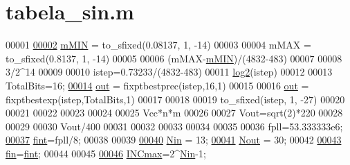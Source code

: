 \hypertarget{tabela__sin_8m_source}{}\section{tabela\+\_\+sin.\+m}

\begin{DoxyCode}
00001                                                                                        
\hypertarget{tabela__sin_8m_source_l00002}{}\hyperlink{tabela__sin_8m_a150e6d543afcb739888f1805186eaf34}{00002} \hyperlink{tabela__sin_8m_a150e6d543afcb739888f1805186eaf34}{mMIN} = to\_sfixed(0.08137,  1, -14)
00003 
00004 mMAX = to\_sfixed(0.8137,  1, -14)
00005 
00006 (mMAX-\hyperlink{tabela__sin_8m_a150e6d543afcb739888f1805186eaf34}{mMIN})/(4832-483)
00007 
00008 3/2^14
00009 
00010 istep=0.73233/(4832-483)
00011 \hyperlink{tabela__sin_8m_a96930559dafc6536b32fb1c2fc65a068}{log2}(istep)
00012 
00013 TotalBits=16;
\hypertarget{tabela__sin_8m_source_l00014}{}\hyperlink{tabela__sin_8m_a2a89187d8e8e8fba509ef9ab5f815d88}{00014} \hyperlink{tabela__sin_8m_a2a89187d8e8e8fba509ef9ab5f815d88}{out} = fixptbestprec(istep,16,1) 
00015 
00016 \hyperlink{tabela__sin_8m_a2a89187d8e8e8fba509ef9ab5f815d88}{out} = fixptbestexp(istep,TotalBits,1)
00017 
00018 
00019 to\_sfixed(istep,  1, -27)
00020 
00021 
00022 %
00023 
00024 
00025 Vcc*n*m
00026 
00027 Vout=sqrt(2)*220
00028 
00029 
00030 Vout/400
00031 
00032 
00033 %
00034 
00035 
00036 fpll=53.333333e6;
\hypertarget{tabela__sin_8m_source_l00037}{}\hyperlink{tabela__sin_8m_a3dcf35661bfc40ffb87f3a8129bcd4db}{00037} \hyperlink{tabela__sin_8m_a3dcf35661bfc40ffb87f3a8129bcd4db}{fint}=fpll/8;
00038 
00039 
\hypertarget{tabela__sin_8m_source_l00040}{}\hyperlink{tabela__sin_8m_add73c22154ea2d5778d1c80257b17dba}{00040} \hyperlink{tabela__sin_8m_add73c22154ea2d5778d1c80257b17dba}{Nin} = 13;  %
\hypertarget{tabela__sin_8m_source_l00041}{}\hyperlink{tabela__sin_8m_a88dcea275654fb4b9796f8d4d937e4c6}{00041} \hyperlink{tabela__sin_8m_a88dcea275654fb4b9796f8d4d937e4c6}{Nout} = 30;  %
00042 
\hypertarget{tabela__sin_8m_source_l00043}{}\hyperlink{tabela__sin_8m_aca64ecb7d3e71038fc46cb491323dd31}{00043} \hyperlink{tabela__sin_8m_aca64ecb7d3e71038fc46cb491323dd31}{fin}=\hyperlink{tabela__sin_8m_a3dcf35661bfc40ffb87f3a8129bcd4db}{fint};
00044 
00045 
\hypertarget{tabela__sin_8m_source_l00046}{}\hyperlink{tabela__sin_8m_ae474c9220a3d08b3c69e1922b9e8210b}{00046} \hyperlink{tabela__sin_8m_ae474c9220a3d08b3c69e1922b9e8210b}{INCmax}=2^\hyperlink{tabela__sin_8m_add73c22154ea2d5778d1c80257b17dba}{Nin}-1; %

\end{DoxyCode}
